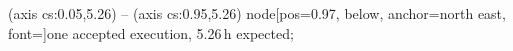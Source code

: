  (axis cs:0.05,5.26) -- (axis cs:0.95,5.26) node[pos=0.97, below, anchor=north east, font=\scriptsize]{one accepted execution, 5.26\,h expected};
